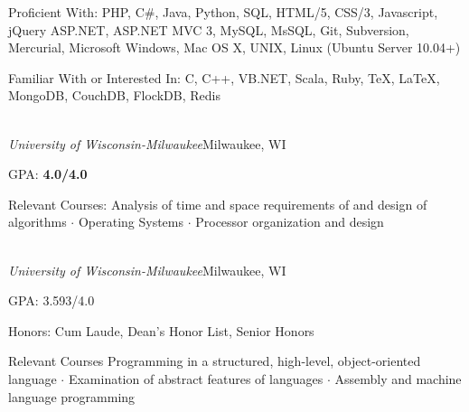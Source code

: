 \documentclass[11pt]{article}
\newcommand{\marginhead}[1]{\marginpar{\textsf{{\footnotesize\flushright #1}}}}
\newcommand{\smaller}{\fontsize{9}{11}\selectfont}
\begin{document}
\begin{description}
	\setlength{\itemsep}{2pt}\small\begin{spacing}{1}
	
	\item[Proficient With: ] {\small 
		PHP, C\#, Java, Python, SQL, HTML/5, CSS/3, Javascript, jQuery
		ASP.NET, ASP.NET MVC 3,
		MySQL, MsSQL,
		Git, Subversion, Mercurial,
		Microsoft Windows, Mac OS X, UNIX, Linux (Ubuntu Server 10.04+)
	}
	
	\item[Familiar With or Interested In: ] {\small
		C, C++, VB.NET, Scala, Ruby,
		\TeX, \LaTeX,
		MongoDB, CouchDB, FlockDB, Redis
	}

	\end{spacing}
\end{description}


\marginhead{{\vskip -1.35em}\hfill Education}


 \\ {\it University of Wisconsin-Milwaukee}\hfill Milwaukee, WI

\begin{description}
	\setlength{\itemsep}{2pt}\small\begin{spacing}{1}
	
	\item[\smaller GPA:] {\small {\bf 4.0/4.0}}
	\item[\smaller Relevant Courses:] {\small Analysis of time and space requirements of and design of algorithms $\cdot$ Operating Systems $\cdot$ Processor organization and design}
	
	\end{spacing}
\end{description}


 \\ {\it University of Wisconsin-Milwaukee}\hfill Milwaukee, WI

\begin{description}
	\setlength{\itemsep}{2pt}\small\begin{spacing}{1}
	
	\item[\smaller GPA:] {\small 3.593/4.0}
	\item[\smaller Honors:] {\small Cum Laude, Dean's Honor List, Senior Honors}
	\item[\smaller Relevant Courses] {\small Programming in a structured, high-level, object-oriented language $\cdot$} Examination of abstract features of languages $\cdot$ Assembly and machine language programming
	
	\end{spacing}
\end{description}
\end{document}

